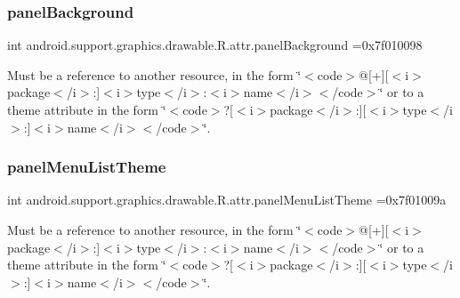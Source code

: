 \subsubsection{\texorpdfstring{panel\+Background}{panelBackground}}
{\footnotesize\ttfamily int android.\+support.\+graphics.\+drawable.\+R.\+attr.\+panel\+Background =0x7f010098\hspace{0.3cm}{\ttfamily [static]}}

Must be a reference to another resource, in the form \char`\"{}$<$code$>$@\mbox{[}+\mbox{]}\mbox{[}$<$i$>$package$<$/i$>$\+:\mbox{]}$<$i$>$type$<$/i$>$\+:$<$i$>$name$<$/i$>$$<$/code$>$\char`\"{} or to a theme attribute in the form \char`\"{}$<$code$>$?\mbox{[}$<$i$>$package$<$/i$>$\+:\mbox{]}\mbox{[}$<$i$>$type$<$/i$>$\+:\mbox{]}$<$i$>$name$<$/i$>$$<$/code$>$\char`\"{}. \mbox{\label{classandroid_1_1support_1_1graphics_1_1drawable_1_1R_1_1attr_a08dc50867a27d91d075f78f645f7d384}} 
\subsubsection{\texorpdfstring{panel\+Menu\+List\+Theme}{panelMenuListTheme}}
{\footnotesize\ttfamily int android.\+support.\+graphics.\+drawable.\+R.\+attr.\+panel\+Menu\+List\+Theme =0x7f01009a\hspace{0.3cm}{\ttfamily [static]}}

Must be a reference to another resource, in the form \char`\"{}$<$code$>$@\mbox{[}+\mbox{]}\mbox{[}$<$i$>$package$<$/i$>$\+:\mbox{]}$<$i$>$type$<$/i$>$\+:$<$i$>$name$<$/i$>$$<$/code$>$\char`\"{} or to a theme attribute in the form \char`\"{}$<$code$>$?\mbox{[}$<$i$>$package$<$/i$>$\+:\mbox{]}\mbox{[}$<$i$>$type$<$/i$>$\+:\mbox{]}$<$i$>$name$<$/i$>$$<$/code$>$\char`\"{}. \mbox{\label{classandroid_1_1support_1_1graphics_1_1drawable_1_1R_1_1attr_a96b96b27845c548314b6af1d31bbf307}} 
